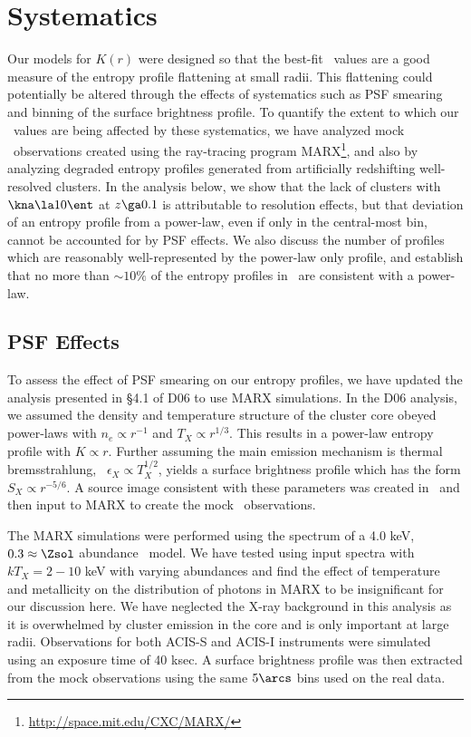 \documentclass{emulateapj}
\begin{document}
\section{Systematics}
\label{sec:sys}

Our models for $K(r)$ were designed so that the best-fit \kna\ values
are a good measure of the entropy profile flattening at small
radii. This flattening could potentially be altered through the
effects of systematics such as PSF smearing and binning of the surface
brightness profile. To quantify the extent to which our
\kna\ values are being affected by these systematics, we have analyzed
mock \chandra\ observations created using the ray-tracing program
MARX\footnote{\url{http://space.mit.edu/CXC/MARX/}}, and also by
analyzing degraded entropy profiles generated from artificially
redshifting well-resolved clusters. In the analysis below, we show
that the lack of clusters with $\kna \la 10 \ent$ at $z \ga 0.1$ is
attributable to resolution effects, but that deviation of an entropy
profile from a power-law, even if only in the central-most bin, cannot
be accounted for by PSF effects. We also discuss the number of
profiles which are reasonably well-represented by the power-law only
profile, and establish that no more than $\sim 10\%$ of the entropy
profiles in \accept\ are consistent with a power-law.

\subsection{PSF Effects}
\label{sec:psf}

To assess the effect of PSF smearing on our entropy profiles, we have
updated the analysis presented in \S4.1 of D06 to use MARX
simulations. In the D06 analysis, we assumed the density and
temperature structure of the cluster core obeyed power-laws with $n_e
\propto r^{-1}$ and $T_X \propto r^{1/3}$. This results in a power-law
entropy profile with $K \propto r$. Further assuming the main emission
mechanism is thermal bremsstrahlung, \ie\ $\epsilon_X \propto
T_X^{1/2}$, yields a surface brightness profile which has the form
$S_X \propto r^{-5/6}$. A source image consistent with these
parameters was created in \idl\ and then input to MARX to create the
mock \chandra\ observations.

The MARX simulations were performed using the spectrum of a 4.0 keV,
$0.3 \approx \Zsol$ abundance \mekal\ model. We have tested using
input spectra with $kT_X = 2-10$ keV with varying abundances and find
the effect of temperature and metallicity on the distribution of
photons in MARX to be insignificant for our discussion here. We have
neglected the X-ray background in this analysis as it is overwhelmed
by cluster emission in the core and is only important at large
radii. Observations for both ACIS-S and ACIS-I instruments were
simulated using an exposure time of 40 ksec. A surface brightness
profile was then extracted from the mock observations using the same
$5\arcs$ bins used on the real data.
\end{document}
